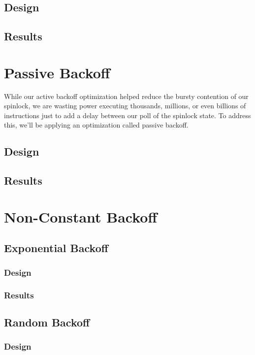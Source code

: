 \documentclass[11pt,fancy,authoryear]{elegantbook}
\begin{document}
\section{Design}

\section{Results}

\chapter{Passive Backoff}

While our active backoff optimization helped reduce the bursty contention of our spinlock, we are wasting power executing thousands, millions, or even billions of instructions just to add a delay between our poll of the spinlock state. To address this, we'll be applying an optimization called passive backoff.

\section{Design}

\section{Results}

\chapter{Non-Constant Backoff}

\section{Exponential Backoff}

\subsection{Design}

\subsection{Results}

\section{Random Backoff}

\subsection{Design}
\end{document}
